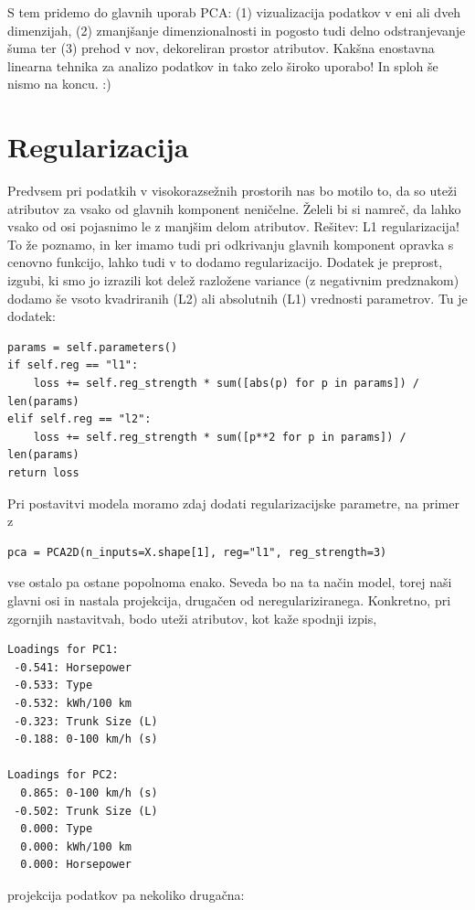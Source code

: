 S tem pridemo do glavnih uporab PCA: (1) vizualizacija podatkov v eni ali dveh dimenzijah, (2) zmanjšanje dimenzionalnosti in pogosto tudi delno odstranjevanje šuma ter (3) prehod v nov, dekoreliran prostor atributov. Kakšna enostavna linearna tehnika za analizo podatkov in tako zelo široko uporabo! In sploh še nismo na koncu. :)



\section{Regularizacija}

Predvsem pri podatkih v visokorazsežnih prostorih nas bo motilo to, da so uteži atributov za vsako od glavnih komponent neničelne. Želeli bi si namreč, da lahko vsako od osi pojasnimo le z manjšim delom atributov. Rešitev: L1 regularizacija! To že poznamo, in ker imamo tudi pri odkrivanju glavnih komponent opravka s cenovno funkcijo, lahko tudi v to dodamo regularizacijo. Dodatek je preprost, izgubi, ki smo jo izrazili kot delež razložene variance (z negativnim predznakom) dodamo še vsoto kvadriranih (L2) ali absolutnih (L1) vrednosti parametrov. Tu je dodatek:

\vspace*{3mm}
\begin{lstlisting}
params = self.parameters()
if self.reg == "l1":
    loss += self.reg_strength * sum([abs(p) for p in params]) / len(params)
elif self.reg == "l2":
    loss += self.reg_strength * sum([p**2 for p in params]) / len(params)
return loss
\end{lstlisting}

Pri postavitvi modela moramo zdaj dodati regularizacijske parametre, na primer z
%
\vspace*{3mm}
\begin{lstlisting}
pca = PCA2D(n_inputs=X.shape[1], reg="l1", reg_strength=3)
\end{lstlisting}
%
vse ostalo pa ostane popolnoma enako. Seveda bo na ta način model, torej naši glavni osi in nastala projekcija, drugačen od neregulariziranega. Konkretno, pri zgornjih nastavitvah, bodo uteži atributov, kot kaže spodnji izpis,
%
\vspace*{3mm}
\begin{lstlisting}
Loadings for PC1:
 -0.541: Horsepower
 -0.533: Type
 -0.532: kWh/100 km
 -0.323: Trunk Size (L)
 -0.188: 0-100 km/h (s)

Loadings for PC2:
  0.865: 0-100 km/h (s)
 -0.502: Trunk Size (L)
  0.000: Type
  0.000: kWh/100 km
  0.000: Horsepower
\end{lstlisting}
%
projekcija podatkov pa nekoliko drugačna:

